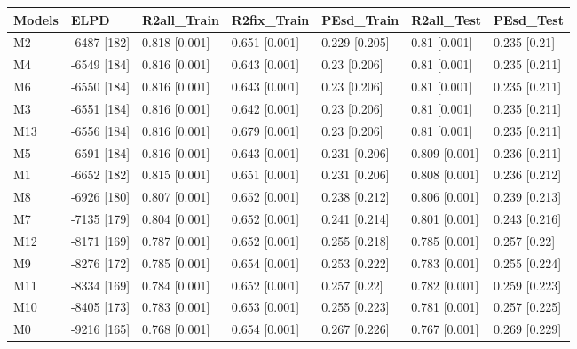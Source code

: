 \begin{table}[ht]
\centering
\begin{tabular}{lllllll}
  \hline
Models & ELPD & R2all\_Train & R2fix\_Train & PEsd\_Train & R2all\_Test & PEsd\_Test \\ 
  \hline
M2 & -6487 [182] & 0.818 [0.001] & 0.651 [0.001] & 0.229 [0.205] & 0.81 [0.001] & 0.235 [0.21] \\ 
  M4 & -6549 [184] & 0.816 [0.001] & 0.643 [0.001] & 0.23 [0.206] & 0.81 [0.001] & 0.235 [0.211] \\ 
  M6 & -6550 [184] & 0.816 [0.001] & 0.643 [0.001] & 0.23 [0.206] & 0.81 [0.001] & 0.235 [0.211] \\ 
  M3 & -6551 [184] & 0.816 [0.001] & 0.642 [0.001] & 0.23 [0.206] & 0.81 [0.001] & 0.235 [0.211] \\ 
  M13 & -6556 [184] & 0.816 [0.001] & 0.679 [0.001] & 0.23 [0.206] & 0.81 [0.001] & 0.235 [0.211] \\ 
  M5 & -6591 [184] & 0.816 [0.001] & 0.643 [0.001] & 0.231 [0.206] & 0.809 [0.001] & 0.236 [0.211] \\ 
  M1 & -6652 [182] & 0.815 [0.001] & 0.651 [0.001] & 0.231 [0.206] & 0.808 [0.001] & 0.236 [0.212] \\ 
  M8 & -6926 [180] & 0.807 [0.001] & 0.652 [0.001] & 0.238 [0.212] & 0.806 [0.001] & 0.239 [0.213] \\ 
  M7 & -7135 [179] & 0.804 [0.001] & 0.652 [0.001] & 0.241 [0.214] & 0.801 [0.001] & 0.243 [0.216] \\ 
  M12 & -8171 [169] & 0.787 [0.001] & 0.652 [0.001] & 0.255 [0.218] & 0.785 [0.001] & 0.257 [0.22] \\ 
  M9 & -8276 [172] & 0.785 [0.001] & 0.654 [0.001] & 0.253 [0.222] & 0.783 [0.001] & 0.255 [0.224] \\ 
  M11 & -8334 [169] & 0.784 [0.001] & 0.652 [0.001] & 0.257 [0.22] & 0.782 [0.001] & 0.259 [0.223] \\ 
  M10 & -8405 [173] & 0.783 [0.001] & 0.653 [0.001] & 0.255 [0.223] & 0.781 [0.001] & 0.257 [0.225] \\ 
  M0 & -9216 [165] & 0.768 [0.001] & 0.654 [0.001] & 0.267 [0.226] & 0.767 [0.001] & 0.269 [0.229] \\ 
   \hline
\end{tabular}
\end{table}
